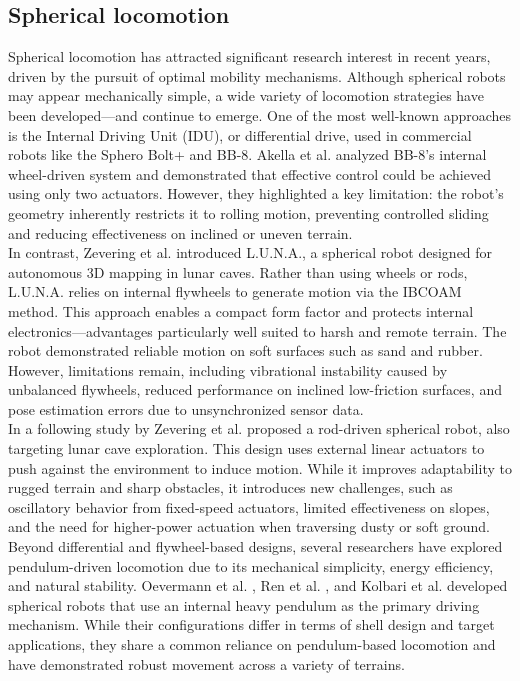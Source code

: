 \documentclass[conference]{IEEEtran}
\begin{document}
\subsection{Spherical locomotion}
Spherical locomotion has attracted significant research interest in recent years, driven by the pursuit of optimal mobility mechanisms. Although spherical robots may appear mechanically simple, a wide variety of locomotion strategies have been developed—and continue to emerge. One of the most well-known approaches is the Internal Driving Unit (IDU), or differential drive, used in commercial robots like the Sphero Bolt+ and BB-8. Akella et al.\cite{Sphero} analyzed BB-8’s internal wheel-driven system and demonstrated that effective control could be achieved using only two actuators. However, they highlighted a key limitation: the robot’s geometry inherently restricts it to rolling motion, preventing controlled sliding and reducing effectiveness on inclined or uneven terrain.\\
\hspace*{1em}In contrast, Zevering et al.\cite{luna} introduced L.U.N.A., a spherical robot designed for autonomous 3D mapping in lunar caves. Rather than using wheels or rods, L.U.N.A. relies on internal flywheels to generate motion via the IBCOAM method. This approach enables a compact form factor and protects internal electronics—advantages particularly well suited to harsh and remote terrain. The robot demonstrated reliable motion on soft surfaces such as sand and rubber. However, limitations remain, including vibrational instability caused by unbalanced flywheels, reduced performance on inclined low-friction surfaces, and pose estimation errors due to unsynchronized sensor data.\\
\hspace*{1em}In a following study by Zevering et al.\cite{rod_sphere} proposed a rod-driven spherical robot, also targeting lunar cave exploration. This design uses external linear actuators to push against the environment to induce motion. While it improves adaptability to rugged terrain and sharp obstacles, it introduces new challenges, such as oscillatory behavior from fixed-speed actuators, limited effectiveness on slopes, and the need for higher-power actuation when traversing dusty or soft ground.\\
\hspace*{1em}Beyond differential and flywheel-based designs, several researchers have explored pendulum-driven locomotion due to its mechanical simplicity, energy efficiency, and natural stability. Oevermann et al. \cite{roboball}, Ren et al. \cite{novelsphere}, and  Kolbari et al. \cite{pendulum_sphere} developed spherical robots that use an internal heavy pendulum as the primary driving mechanism. While their configurations differ in terms of shell design and target applications, they share a common reliance on pendulum-based locomotion and have demonstrated robust movement across a variety of terrains.\\
\end{document}
